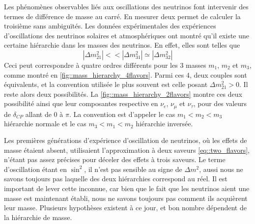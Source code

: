             Les phénomènes observables liés aux oscillations des neutrinos font intervenir des termes de différence de masse au carré. En mesurer deux permet de calculer la troisième sans ambiguïtés. Les données expérimentales des expériences d'oscillations des neutrinos solaires\cite{ref_needed} et atmosphériques\cite{ref_needed} ont montré qu'il existe une certaine hiérarchie dans les masses des neutrinos. En effet, elles sont telles que
            \begin{equation}\label{eq::mass_hierarchy}
            	|\Delta m^2_{21}| <<|\Delta m^2_{31}| \simeq |\Delta m^2_{32}| 
            \end{equation}
            Ceci peut correspondre à quatre ordres différents pour les 3 masses $m_1$, $m_2$ et $m_3$, comme montré en \autoref{fig::mass_hierarchy_4flavors}. Parmi ces 4, deux couples sont équivalents\cite{pdg2018}, et la convention utilisée le plus souvent est celle posant $\Delta m^2_{21} > 0$. Il reste alors deux possibilités. La \autoref{fig::mass_hierarchy_2flavors} montre ces deux possibilité ainsi que leur composantes respective en $\nu_e$, $\nu_{\mu}$ et $\nu_{\tau}$, pour des valeurs de $\delta_{CP}$ allant de 0 à $\pi$\cite{ref_needed}. La convention est d'appeler le cas $m_1 < m_2 < m_3$ hiérarchie normale et le cas $m_3 < m_1 < m_2$ hiérarchie inversée.
            
            Les premières générations d'expérience d'oscillation de neutrinos, où les effets de masse étaient absent, utilisaient l'approximation à deux saveurs \eqref{eq::two_flavors}, n'étant pas assez précises pour déceler des effets à trois saveurs. Le terme d'oscillation étant en $\sin^2$, il n'est pas sensible au signe de $\Delta m^2$, aussi nous ne savons toujours pas laquelle des deux hiérarchies correspond au réel. Il est important de lever cette inconnue, car bien que le fait que les neutrinos aient une masse est maintenant établi, nous ne savons toujours pas comment ils acquièrent leur masse. Plusieurs hypothèses existent à ce jour, et bon nombre dépendent de la hiérarchie de masse\cite{ref_needed}.
            
